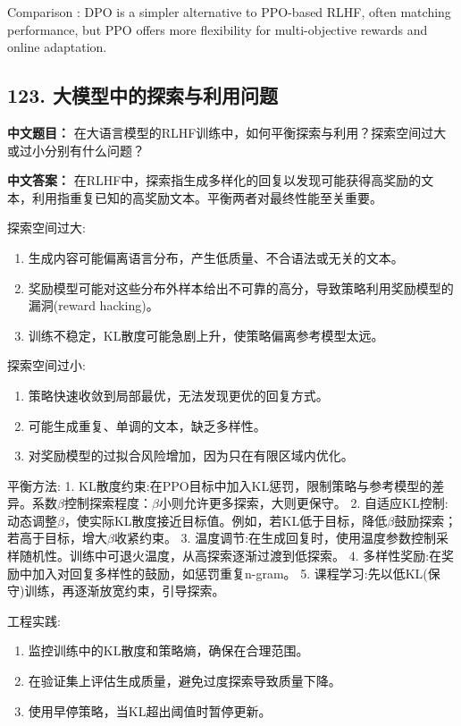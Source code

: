 \documentclass[10pt,a4paper]{ctexart}
\begin{document}
 Comparison : DPO is a simpler alternative to PPO-based RLHF, often matching performance, but PPO offers more flexibility for multi-objective rewards and online adaptation.

\subsection*{123. 大模型中的探索与利用问题}
\textbf{中文题目：} 在大语言模型的RLHF训练中，如何平衡探索与利用？探索空间过大或过小分别有什么问题？

\textbf{中文答案：}  
在RLHF中，探索指生成多样化的回复以发现可能获得高奖励的文本，利用指重复已知的高奖励文本。平衡两者对最终性能至关重要。

 探索空间过大:
\begin{enumerate}
    \item 生成内容可能偏离语言分布，产生低质量、不合语法或无关的文本。
    \item 奖励模型可能对这些分布外样本给出不可靠的高分，导致策略利用奖励模型的漏洞(reward hacking)。
    \item 训练不稳定，KL散度可能急剧上升，使策略偏离参考模型太远。
\end{enumerate}

 探索空间过小:
\begin{enumerate}
    \item 策略快速收敛到局部最优，无法发现更优的回复方式。
    \item 可能生成重复、单调的文本，缺乏多样性。
    \item 对奖励模型的过拟合风险增加，因为只在有限区域内优化。
\end{enumerate}

 平衡方法:
1.  KL散度约束:在PPO目标中加入KL惩罚，限制策略与参考模型的差异。系数\(\beta\)控制探索程度：\(\beta\)小则允许更多探索，大则更保守。
2.  自适应KL控制:动态调整\(\beta\)，使实际KL散度接近目标值。例如，若KL低于目标，降低\(\beta\)鼓励探索；若高于目标，增大\(\beta\)收紧约束。
3.  温度调节:在生成回复时，使用温度参数控制采样随机性。训练中可退火温度，从高探索逐渐过渡到低探索。
4.  多样性奖励:在奖励中加入对回复多样性的鼓励，如惩罚重复n-gram。
5.  课程学习:先以低KL(保守)训练，再逐渐放宽约束，引导探索。

 工程实践:
\begin{enumerate}
    \item 监控训练中的KL散度和策略熵，确保在合理范围。
    \item 在验证集上评估生成质量，避免过度探索导致质量下降。
    \item 使用早停策略，当KL超出阈值时暂停更新。
\end{enumerate}
\end{document}
